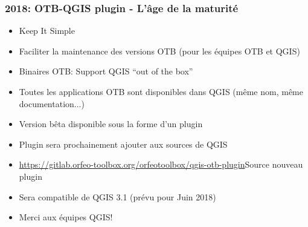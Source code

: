 \begin{frame}
  \frametitle{2018: OTB-QGIS plugin - L'âge de la maturité}
  \begin{itemize}
  \item Keep It Simple
  \item Faciliter la maintenance des versions OTB (pour les équipes OTB et QGIS)
  \item Binaires OTB: Support QGIS ``out of the box''
  \item Toutes les applications OTB sont disponibles dans QGIS (même nom, même documentation...)  
  \item \alert{Version bêta} disponible sous la forme d'un plugin
  \item Plugin sera prochainement ajouter aux sources de QGIS
  \item
    \href{https://gitlab.orfeo-toolbox.org/orfeotoolbox/qgis-otb-plugin}{https://gitlab.orfeo-toolbox.org/orfeotoolbox/qgis-otb-plugin}{Source
      nouveau plugin}
  \item Sera compatible de QGIS 3.1 (prévu pour Juin 2018)
  \item Merci aux équipes QGIS!
  \end{itemize}
\end{frame}

